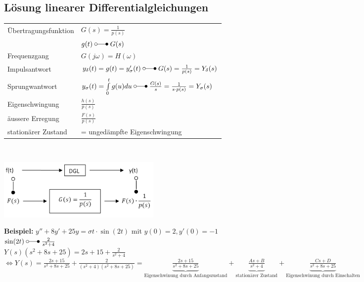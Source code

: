 	\subsection{Lösung linearer Differentialgleichungen}
		\begin{minipage}{11.5cm}
			\renewcommand{\arraystretch}{2}
			\begin{tabular}{| l | l |}
				\hline
					Übertragungsfunktion & $G(s) = \frac{1}{p(s)}$\\
					& $g(t) \; \laplace \; G(s)$ \\
				\hline
					Frequenzgang & $G(j\omega) = H(\omega)$ \\
				\hline
					Impulsantwort & $y_{\delta}(t) = g(t) = y_{\sigma}'(t) \; \laplace \; G(s) = \frac{1}{p(s)}=Y_{\delta}(s)$\\
				\hline
					Sprungwantwort & $y_{\sigma}(t)=\int\limits_0^t g(u) du \; \laplace \; \frac{G(s)}{s} = \frac{1}{s \cdot p(s)} = Y_{\sigma}(s)$\\
				\hline
					Eigenschwingung & $\frac{h(s)}{p(s)}$ \\
				\hline
					äussere Erregung & $\frac{F(s)}{p(s)}$ \\
				\hline
					stationärer Zustand & = ungedämpfte Eigenschwingung\\
				\hline
			\end{tabular}
			\renewcommand{\arraystretch}{\arraystretchOriginal}\\
		\end{minipage}
		\begin{minipage}{8cm}
					\includegraphics[width=8cm]{./bilder/diffgleichungen2.png} \\
		\end{minipage}
		
		
		\begin{minipage}[l]{16cm}
				\textbf{Beispiel:} $y'' + 8y' + 25y = \sigma{t} \cdot \sin(2t)$ mit $y(0) = 2, y'(0) = -1$\\
				
				$\sin(2t) \; \laplace \; \frac{2}{s^2+4}$ \\ $Y(s)(s^2+8s+25) = 2s+15+\frac{2}{s^2+4}$
				$\Leftrightarrow Y(s) = \frac{2s+15}{s^2+8s+25}+\frac{2}{(s^2+4)(s^2+8s+25)}=
				\underbrace{\frac{2s+15}{s^2+8s+25}}_\text{Eigenschwinung durch Anfangszustand} +
				\underbrace{\frac{As + B}{s^2+4}}_\text{stationärer Zustand} +
				\underbrace{\frac{Cs + D}{s^2+8s+25}}_\text{Eigenschwinung durch Einschalten}$
		\end{minipage}
